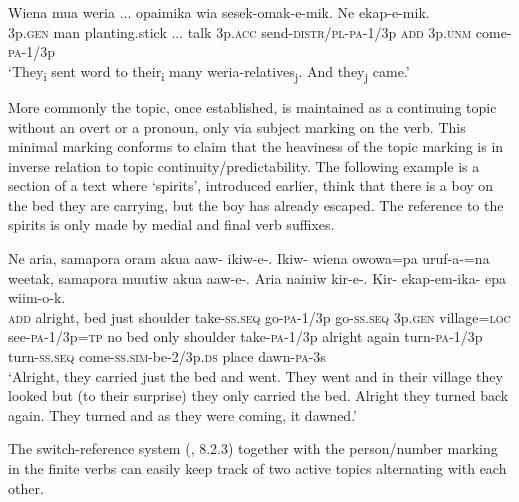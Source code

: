 \ea%
\label{ex:9:x1868}
\gll Wiena  mua  weria  ...  opaimika  wia sesek-omak-e-mik.  Ne    ekap-e-mik. \\
3p.\textsc{gen}  man  planting.stick  ...  talk  3p.\textsc{acc} send-\textsc{distr}/\textsc{pl}-\textsc{pa}-1/3p  \textsc{add}  3p.\textsc{unm}  come-\textsc{pa}-1/3p     \\
\glt`They\textsubscript{i} sent word to their\textsubscript{i} many weria-relatives\textsubscript{j}. And they\textsubscript{j} came.' 
\z


More commonly the topic, once established, is maintained as a continuing topic without an overt  or a pronoun, only via subject marking on the verb. This minimal marking conforms to  claim that the heaviness of the topic marking is in inverse relation to topic continuity/predictability. The following example is a section of a text where  `spirits', introduced earlier, think that there is a boy on the bed they are carrying, but the boy has already escaped. The reference to the spirits is only made by medial and final verb suffixes. 

\ea%
\label{ex:9:x1675}
\gll Ne  aria,  samapora  oram  akua  aaw-  ikiw-e-. Ikiw-  wiena  owowa=pa  uruf-a-=na  weetak, samapora  muutiw  akua  aaw-e-. Aria  nainiw  kir-e-.  Kir-  ekap-em-ika- epa  wiim-o-k.\\
\textsc{add}  alright,  bed  just  shoulder  take-\textsc{ss}.\textsc{seq}  go-\textsc{pa}-1/3p go-\textsc{ss}.\textsc{seq}  3p.\textsc{gen}  village=\textsc{loc}  see-\textsc{pa}-1/3p=\textsc{tp}  no bed  only  shoulder  take-\textsc{pa}-1/3p alright  again  turn-\textsc{pa}-1/3p  turn-\textsc{ss}.\textsc{seq}  come-\textsc{ss}.\textsc{sim}-be-2/3p.\textsc{ds} place  dawn-\textsc{pa}-3s\\
\glt`Alright, they carried just the bed and went. They went and in their village they looked but (to their surprise) they only carried the bed. Alright they turned back again. They turned and as they were coming, it dawned.'
\z


The switch-reference system (, 8.2.3) together with the person/number marking in the finite verbs can easily keep track of two active topics alternating with each other. 

